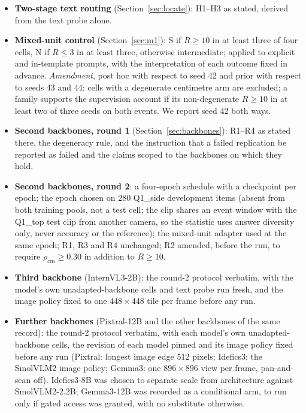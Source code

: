 \documentclass[preprint,number]{elsarticle}
\begin{document}
\begin{itemize}
\item \textbf{Two-stage text routing} (Section~\ref{sec:locate}): H1--H3 as
  stated, derived from the text probe alone.
\item \textbf{Mixed-unit control} (Section~\ref{sec:m1}): S if $R\ge10$ in at
  least three of four cells, N if $R\le3$ in at least three, otherwise
  intermediate; applied to explicit and in-template prompts, with the
  interpretation of each outcome fixed in advance. \emph{Amendment}, post hoc
  with respect to seed 42 and prior with respect to seeds 43 and 44: cells with
  a degenerate centimetre arm are excluded; a family supports the supervision
  account if its non-degenerate $R\ge10$ in at least two of three seeds on both
  events. We report seed 42 both ways.
\item \textbf{Second backbones, round 1} (Section~\ref{sec:backbones}): R1--R4
  as stated there, the degeneracy rule, and the instruction that a failed
  replication be reported as failed and the claims scoped to the backbones on
  which they hold.
\item \textbf{Second backbones, round 2}: a four-epoch schedule with a
  checkpoint per epoch; the epoch chosen on 280 Q1\_side development items
  (absent from both training pools, not a test cell; the clip shares an event
  window with the Q1\_top test clip from another camera, so the statistic uses
  answer diversity only, never accuracy or the reference); the mixed-unit
  adapter used at the same epoch; R1, R3 and R4 unchanged; R2 amended, before
  the run, to require $\rho_{\mathrm{cm}}\ge0.30$ in addition to $R\ge10$.
\item \textbf{Third backbone} (InternVL3-2B): the round-2 protocol verbatim,
  with the model's own unadapted-backbone cells and text probe run fresh, and
  the image policy fixed to one $448\times448$ tile per frame before any run.
\item \textbf{Further backbones} (Pixtral-12B and the other backbones of the
  same record): the round-2 protocol verbatim, with each model's own
  unadapted-backbone cells, the revision of each model pinned and its image
  policy fixed before any run (Pixtral: longest image edge 512 pixels;
  Idefics3: the SmolVLM2 image policy; Gemma3: one $896\times896$ view per
  frame, pan-and-scan off). Idefics3-8B was chosen to separate scale from
  architecture against SmolVLM2-2.2B; Gemma3-12B was recorded as a conditional
  arm, to run only if gated access was granted, with no substitute otherwise.

\end{itemize}
\end{document}
